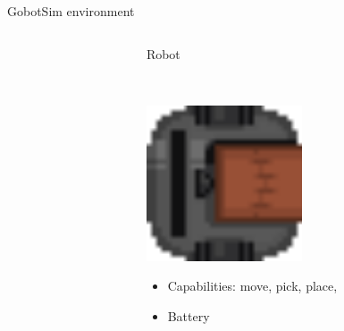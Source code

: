 \begin{frame}{GobotSim environment}
\begin{columns}[t]
\begin{column}{0.32\textwidth}
        \end{column}
        \pause
        \begin{column}{0.32\textwidth}
            \centering
            Robot

            ~~

            \includegraphics[width = 0.5\textwidth]{images/godot/robot_texture.png}
            \small
            \begin{itemize}
                \item Capabilities: move, pick, place,
                \item Battery
            \end{itemize}
        \end{column}
    \end{columns}
\end{frame}


            

    

